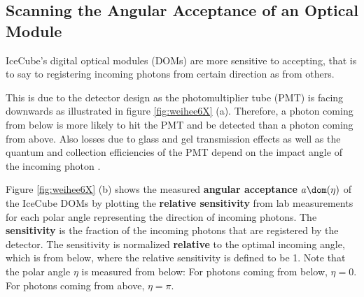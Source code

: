 
\subsection{Scanning the Angular Acceptance of an Optical Module}
\label{sec:angular_acceptance_scan}

IceCube's digital optical modules (DOMs) are more sensitive to accepting, that is to say to registering incoming photons from certain direction as from others.

This is due to the detector design as the photomultiplier tube (PMT) is facing downwards as illustrated in figure \ref{fig:weihee6X} (a). Therefore, a photon coming from below is more likely to hit the PMT and be detected than a photon coming from above. Also losses due to glass and gel transmission effects as well as the quantum and collection efficiencies of the PMT depend on the impact angle of the incoming photon \cite{icepaper}.


Figure \ref{fig:weihee6X} (b) shows the measured \textbf{angular acceptance} $a\dom(\eta)$ of the IceCube DOMs by plotting the \textbf{relative sensitivity} from lab measurements for each polar angle representing the direction of incoming photons. \cite{icepaper} The \textbf{sensitivity} is the fraction of the incoming photons that are registered by the detector. The sensitivity is normalized \textbf{relative} to the optimal incoming angle, which is from below, where the relative sensitivity is defined to be 1. Note that the polar angle $\eta$ is measured from below: For photons coming from below, $\eta = 0$. For photons coming from above, $\eta = \pi$.


